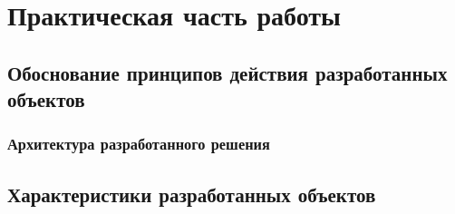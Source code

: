 \chapter{Практическая часть работы}
\section{Обоснование принципов действия разработанных объектов}
\subsection{Архитектура разработанного решения}

\section{Характеристики разработанных объектов}
